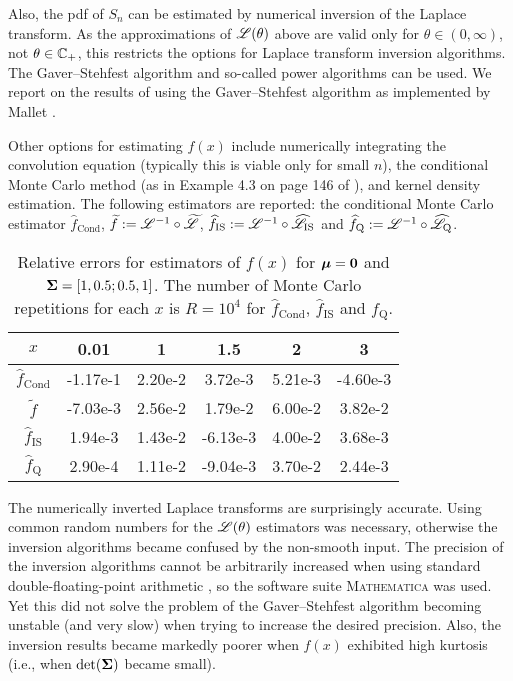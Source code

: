 Also, the pdf of $S_n$ can be estimated by numerical inversion of the
Laplace transform. As the approximations of $\mathscr{L}(\theta)$ above are
valid only for $\theta \in (0, \infty)$, not $\theta \in \mathbb{C}_{+}$, this
restricts the options for Laplace transform inversion algorithms. The
Gaver--Stehfest algorithm \cite{stehfest1970algorithm} and so-called power
algorithms \cite{avdis2007power} can be used. We report on the results of
using the Gaver--Stehfest algorithm as implemented by Mallet
\cite{mallet1985numerical}.

Other options for estimating $f(x)$ include numerically integrating the
convolution equation (typically this is viable only for small $n$), the
conditional Monte Carlo method (as in Example 4.3 on page 146 of
\cite{asmussen2007stochastic}), and kernel density estimation. The following
estimators are reported: the conditional Monte Carlo estimator
$\widehat{f}_{\mathrm{Cond}}$, $\widetilde{f} :=
\mathscr{L}^{-1} \circ \widetilde{\mathscr{L}}$, $\widehat{f}_{\mathrm{IS}} :=
\mathscr{L}^{-1} \circ \widehat{\mathscr{L}}_{\mathrm{IS}}$ and
$\widehat{f}_{\mathrm{Q}} :=
\mathscr{L}^{-1} \circ \widehat{\mathscr{L}}_{\mathrm{Q}}$.

\begin{table}[ht]
\centering
\caption{Relative errors for estimators of $f(x)$ for $\bm{\mu} = \bm{0}$ and
  $\bm{\Sigma} = [1, 0.5; 0.5, 1]$. The number of Monte Carlo repetitions for
  each $x$ is $R=10^4$ for $\widehat{f}_{\mathrm{Cond}}$,
  $\widehat{f}_{\mathrm{IS}} $ and $\widehat{f}_{\mathrm{Q}} $.}
\vspace{3pt}
\begin{tabular}{cccccc}
\hline
{$x$}& 0.01 & 1 & 1.5 & 2 & 3 \\ \hline
$\widehat{f}_{\mathrm{Cond}}$\raisebox{1pt}{\vphantom{$\widehat{f}$}}&
{-1.17e-1 }& {2.20e-2 }& {3.72e-3 }& {5.21e-3 }& {-4.60e-3 } \\
{$\widetilde{f}$}&
{-7.03e-3}& {2.56e-2 }& {1.79e-2 }& {6.00e-2 }& {3.82e-2 } \\
{$\widehat{f}_{\mathrm{IS}}$}&
{1.94e-3 }& {1.43e-2 }& {-6.13e-3}& {4.00e-2 }& {3.68e-3 } \\
{$\widehat{f}_{\mathrm{Q}}$}&
{2.90e-4 }& {1.11e-2 }& {-9.04e-3}& {3.70e-2 }& {2.44e-3 } \\ \hline
\end{tabular}
\end{table}

The numerically inverted Laplace transforms are surprisingly accurate. Using
common random numbers for the $\mathscr{L}(\theta)$ estimators was necessary,
otherwise the inversion algorithms became confused by the non-smooth
input. The precision of the inversion algorithms cannot be arbitrarily
increased when using standard double-floating-point arithmetic
\cite{abate2006unified}, so the software suite \textsc{Mathematica} was
used. Yet this did not solve the problem of the Gaver--Stehfest algorithm
becoming unstable (and very slow) when trying to increase the desired
precision. Also, the inversion results became markedly poorer when $f(x)$
exhibited high kurtosis (i.e., when $\det(\bm{\Sigma})$ became small).


